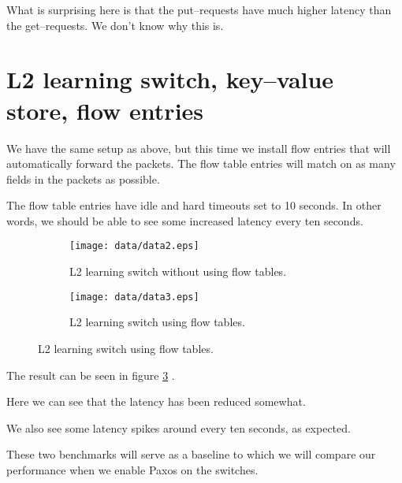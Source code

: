 What is surprising here is that the put--requests have much higher latency
than the get--requests. We don't know why this is.

\section{L2 learning switch, key--value store, flow entries}

We have the same setup as above, but this time we install flow entries that
will automatically forward the packets.  The flow table entries will match
on as many fields in the packets as possible.

The flow table entries have idle and hard timeouts set to 10 seconds.
In other words, we should be able to see some increased latency every ten
seconds.

\begin{figure}
  \centering
  \begin{subfigure}{\textwidth}
    \centering
    \texttt{[image: data/data2.eps]}
    \caption{L2 learning switch without using flow tables.}
    \label{benchmark:l2.learning.switch.no.flows}
  \end{subfigure}

  \centering
  \begin{subfigure}{\textwidth}
    \centering
    \texttt{[image: data/data3.eps]}
    \caption{L2 learning switch using flow tables.}
    \label{benchmark:l2.learning.switch.with.flows}
  \end{subfigure}
\end{figure}

The result can be seen in figure \ref{benchmark:l2.learning.switch.with.flows}
.

Here we can see that the latency has been reduced somewhat.

We also see some latency spikes around every ten seconds, as expected.


These two benchmarks will serve as a baseline to which we will compare our
performance when we enable Paxos on the switches.

